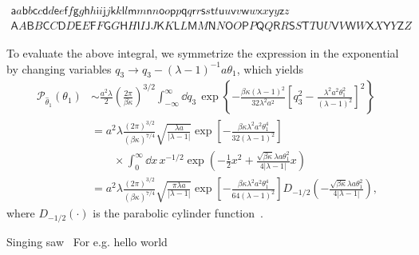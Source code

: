\begin{gather*}
\mathsf{a}a
\mathsf{b}b
\mathsf{c}c
\mathsf{d}d
\mathsf{e}e
\mathsf{f}f
\mathsf{g}g
\mathsf{h}h
\mathsf{i}i
\mathsf{j}j
\mathsf{k}k
\mathsf{l}l
\mathsf{m}m
\mathsf{n}n
\mathsf{o}o
\mathsf{p}p
\mathsf{q}q
\mathsf{r}r
\mathsf{s}s
\mathsf{t}t
\mathsf{u}u
\mathsf{v}v
\mathsf{w}w
\mathsf{x}x
\mathsf{y}y
\mathsf{z}z\\
\mathsf{A}A
\mathsf{B}B
\mathsf{C}C
\mathsf{D}D
\mathsf{E}E
\mathsf{F}F
\mathsf{G}G
\mathsf{H}H
\mathsf{I}I
\mathsf{J}J
\mathsf{K}K
\mathsf{L}L
\mathsf{M}M
\mathsf{N}N
\mathsf{O}O
\mathsf{P}P
\mathsf{Q}Q
\mathsf{R}R
\mathsf{S}S
\mathsf{T}T
\mathsf{U}U
\mathsf{V}V
\mathsf{W}W
\mathsf{X}X
\mathsf{Y}Y
\mathsf{Z}Z
\end{gather*}

To evaluate the above integral, we symmetrize the expression in the exponential by changing variables $q_3 \to q_3 - (\lambda-1)^{-1}a\theta_1$, which yields
\begin{equation}
  \begin{aligned}
    \mathcal{P}_{\hat{\theta}_1}(\theta_1) &\sim \frac{a^2\lambda}{2}\left(\frac{2\pi}{\beta\kappa}\right)^{3/2}\!\int_{-\infty}^{\infty} \dd q_3\, \exp\left\{-\frac{\beta\kappa(\lambda-1)^2}{32\lambda^2 a^2}\left[q_3^2 - \frac{\lambda^2 a^2\theta_1^2}{(\lambda-1)^2}\right]^2\right\}\\
                                           &= a^2\lambda\frac{(2\pi)^{3/2}}{(\beta\kappa)^{7/4}}\sqrt{\frac{\lambda{a}}{|\lambda-1|}}\exp\left[-\frac{\beta\kappa\lambda^2a^2\theta_1^4}{32(\lambda-1)^2}\right]\\
                                           &{} \qquad\times\int_{0}^{\infty} \dd x\, x^{-1/2}\exp\left(-\frac{1}{2}x^2 + \frac{\sqrt{\beta\kappa}\lambda a\theta_1^2}{4|\lambda-1|}x\right)\\
                                           &= a^2\lambda\frac{(2\pi)^{3/2}}{(\beta\kappa)^{7/4}}\sqrt{\frac{\pi\lambda{a}}{|\lambda-1|}}\exp\left[-\frac{\beta\kappa\lambda^2a^2\theta_1^4}{64(\lambda-1)^2}\right]D_{-1/2}\left(-\frac{\sqrt{\beta\kappa}\lambda a\theta_1^2}{4|\lambda-1|}\right),
  \end{aligned}
\end{equation}
where $D_{-1/2}(\cdot)$ is the parabolic cylinder function~\cite{olver2010}.

Singing saw~\cite{stuckenbruck2016}
For e.g. hello world

\the\textwidth
